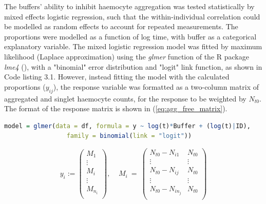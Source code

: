 The buffers' ability to inhibit haemocyte aggregation was tested statistically by mixed effects logistic regression, such that the within-individual correlation could be modelled as random effects to account for repeated measurements. The proportions were modelled as a function of log time, with buffer as a categorical explanatory variable. The mixed logistic regression model was fitted by maximum likelihood (Laplace approximation) using the \emph{glmer} function of the R package \emph{lme4} (\cite{lme4}), with a "binomial" error distribution and "logit" link function, as shown in Code listing 3.1. However, instead fitting the model with the calculated proportions ($y_{ij}$), the response variable was formatted as a two-column matrix of aggregated and singlet haemocyte counts, for the response to be weighted by $N_{t0}$. The format of the response matrix is shown in (\ref{eq:agg_free_matrix}).

\begin{lstlisting}[language=R, caption = {The R source code run to fit the logistic proportion aggregation model.}]
model = glmer(data = df, formula = y ~ log(t)*Buffer + (log(t)|ID),
                 family = binomial(link = "logit"))
\end{lstlisting}

\begin{equation}
    \label{eq:agg_free_matrix}
    y_{i} := \begin{pmatrix}
     M_{1} \\
     \vdots \\
     M_{i} \\
     \vdots \\
     M_{n_{i}} \\
    \end{pmatrix}
    , \; \; \; \; M_{i} \: = \:
    \begin{pmatrix}
      N_{t0} - N_{i1}     &  N_{t0} \\
      \vdots              &  \vdots \\
      N_{t0} - N_{ij}     &  N_{t0} \\
      \vdots              & \vdots \\
      N_{t0} - N_{in_{j}} &  N_{t0} \\      
    \end{pmatrix}
\end{equation}

